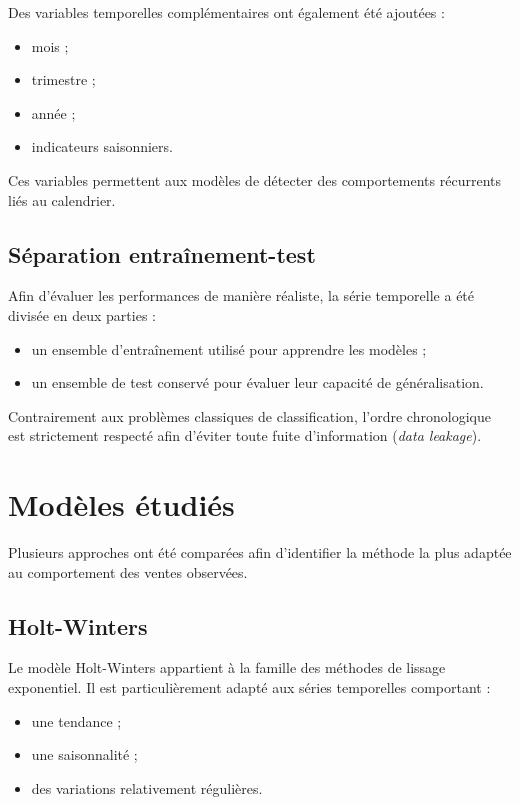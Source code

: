 \documentclass[12pt,a4paper,twoside]{report}
\begin{document}
Des variables temporelles complémentaires ont également été ajoutées :
\begin{itemize}
    \item mois ;
    \item trimestre ;
    \item année ;
    \item indicateurs saisonniers.
\end{itemize}

Ces variables permettent aux modèles de détecter des comportements récurrents liés au calendrier.

\subsection{Séparation entraînement-test}

Afin d'évaluer les performances de manière réaliste, la série temporelle a été divisée en deux parties :
\begin{itemize}
    \item un ensemble d'entraînement utilisé pour apprendre les modèles ;
    \item un ensemble de test conservé pour évaluer leur capacité de généralisation.
\end{itemize}

Contrairement aux problèmes classiques de classification, l'ordre chronologique est strictement respecté afin d'éviter toute fuite d'information (\textit{data leakage}).

\section{Modèles étudiés}

Plusieurs approches ont été comparées afin d'identifier la méthode la plus adaptée au comportement des ventes observées.

\subsection{Holt-Winters}

Le modèle Holt-Winters appartient à la famille des méthodes de lissage exponentiel. Il est particulièrement adapté aux séries temporelles comportant :
\begin{itemize}
    \item une tendance ;
    \item une saisonnalité ;
    \item des variations relativement régulières.
\end{itemize}
\end{document}

